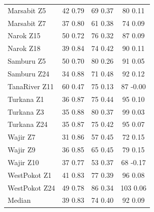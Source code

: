 \documentclass[review]{elsarticle}
\begin{document}
\begin{table}
\begin{tabular}{l|ccc}
		Marsabit Z5 & 42 0.79 & 69 0.37 & 80 0.11 \\
		Marsabit Z7 & 37 0.80 & 61 0.38 & 74 0.09 \\
		Narok Z15 & 50 0.72 & 76 0.32 & 87 0.09 \\
		Narok Z18 & 39 0.84 & 74 0.42 & 90 0.11 \\
		Samburu Z5 & 50 0.70 & 80 0.26 & 91 0.05 \\
		Samburu Z24 & 34 0.88 & 71 0.48 & 92 0.12 \\
		TanaRiver Z11 & 60 0.47 & 75 0.13 & 87 -0.00 \\
		Turkana Z1 & 36 0.87 & 75 0.44 & 95 0.10 \\
		Turkana Z3 & 35 0.88 & 80 0.37 & 99 0.03 \\
		Turkana Z24 & 35 0.87 & 75 0.42 & 95 0.07 \\
		Wajir Z7 & 31 0.86 & 57 0.45 & 72 0.15 \\
		Wajir Z9 & 36 0.85 & 65 0.45 & 79 0.15 \\
		Wajir Z10 & 37 0.77 & 53 0.37 & 68 -0.17 \\
		WestPokot Z1 & 41 0.83 & 77 0.39 & 96 0.08 \\
		WestPokot Z24 & 49 0.78 & 86 0.34 & 103 0.06 \\
		\bottomrule
		Median & 39 0.83 & 74 0.40 & 92 0.09 \\
		\bottomrule
	\end{tabular}
\end{table}
\end{document}
